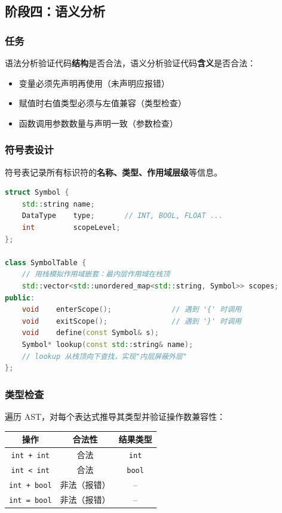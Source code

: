 \documentclass[12pt, a4paper]{ctexart}
\begin{document}
\subsection{阶段四：语义分析}

\subsubsection{任务}

语法分析验证代码\textbf{结构}是否合法，语义分析验证代码\textbf{含义}是否合法：

\begin{itemize}[noitemsep]
  \item 变量必须先声明再使用（未声明应报错）
  \item 赋值时右值类型必须与左值兼容（类型检查）
  \item 函数调用参数数量与声明一致（参数检查）
\end{itemize}

\subsubsection{符号表设计}

符号表记录所有标识符的\textbf{名称、类型、作用域层级}等信息。

\begin{lstlisting}[language=C++, caption={符号表结构示意}]
struct Symbol {
    std::string name;
    DataType    type;       // INT, BOOL, FLOAT ...
    int         scopeLevel;
};

class SymbolTable {
    // 用栈模拟作用域嵌套：最内层作用域在栈顶
    std::vector<std::unordered_map<std::string, Symbol>> scopes;
public:
    void    enterScope();              // 遇到 '{' 时调用
    void    exitScope();               // 遇到 '}' 时调用
    void    define(const Symbol& s);
    Symbol* lookup(const std::string& name);
    // lookup 从栈顶向下查找，实现"内层屏蔽外层"
};
\end{lstlisting}

\subsubsection{类型检查}

遍历 AST，对每个表达式推导其类型并验证操作数兼容性：

\begin{center}
\renewcommand{\arraystretch}{1.3}
\begin{tabular}{ccc}
\toprule
\textbf{操作}      & \textbf{合法性} & \textbf{结果类型} \\
\midrule
\texttt{int + int}  & 合法 & \texttt{int} \\
\texttt{int < int}  & 合法 & \texttt{bool} \\
\texttt{int + bool} & 非法（报错） & -- \\
\texttt{int = bool} & 非法（报错） & -- \\
\bottomrule
\end{tabular}
\end{center}
\end{document}
